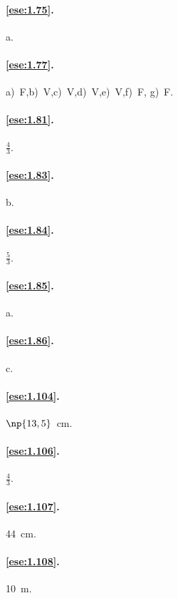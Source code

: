\paragraph{\ref{ese:1.75}.}
a.

\paragraph{\ref{ese:1.77}.}
a)~F,\quad b)~V,\quad c)~V,\quad d)~V,\quad e)~V,\quad f)~F,\quad 
g)~F.

\paragraph{\ref{ese:1.81}.}
\(\frac{4}{3}\).

\paragraph{\ref{ese:1.83}.}
b.

\paragraph{\ref{ese:1.84}.}
\(\frac{5}{3}\).

\paragraph{\ref{ese:1.85}.}
a.

\paragraph{\ref{ese:1.86}.}
c.

\paragraph{\ref{ese:1.104}.}
\(\np{13,5}\)~cm.

\paragraph{\ref{ese:1.106}.}
\(\frac{4}{3}\).

\paragraph{\ref{ese:1.107}.}
44~cm.

\paragraph{\ref{ese:1.108}.}
10~m.

